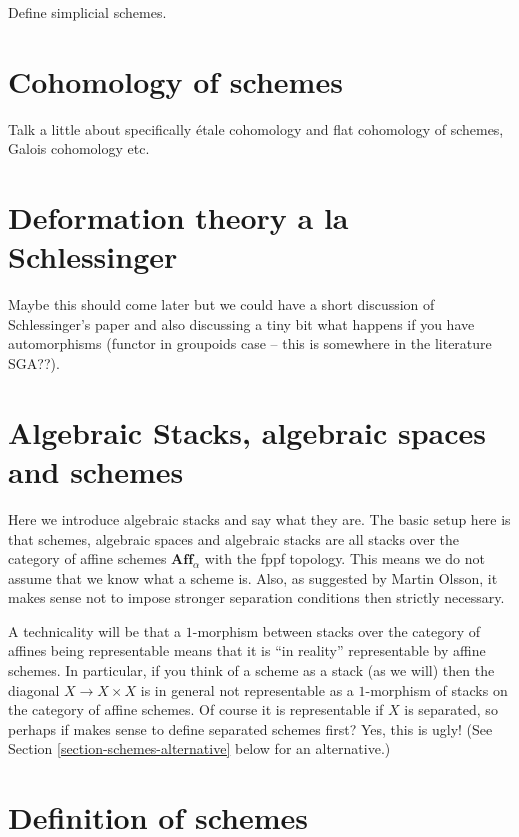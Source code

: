\medskip\noindent
Define simplicial schemes.

\section{Cohomology of schemes}
\label{section-schemes-cohomology}

\noindent
Talk a little about specifically \'etale cohomology and flat cohomology
of schemes, Galois cohomology etc.

\section{Deformation theory a la Schlessinger}
\label{section-deformation-schlessinger}

\noindent
Maybe this should come later but we could have a short discussion of
Schlessinger's paper and also discussing a tiny bit what happens if
you have automorphisms (functor in groupoids case -- this is somewhere
in the literature SGA??).

\section{Algebraic Stacks, algebraic spaces and schemes}
\label{section-algebraic-stacks}

\noindent
Here we introduce algebraic stacks and say what they are. The basic setup
here is that schemes, algebraic spaces and algebraic stacks are all
stacks over the category of affine schemes $\textbf{Aff}_\alpha$ with
the fppf topology. This means we do not assume that we know what a scheme
is. Also, as suggested by Martin Olsson, it makes sense not to impose
stronger separation conditions then strictly necessary.

\medskip\noindent
A technicality will be that a $1$-morphism between stacks over the category
of affines being representable means that it is ``in reality'' representable
by affine schemes. In particular, if you think of a scheme as a stack (as we
will) then the diagonal $X \to X\times X$ is in general not representable as
a $1$-morphism of stacks on the category of affine schemes. Of course it is
representable if $X$ is separated, so perhaps if makes sense to define
separated schemes first? Yes, this is ugly! (See
Section \ref{section-schemes-alternative} below for an alternative.)

\section{Definition of schemes}
\label{section-definition-schemes}

